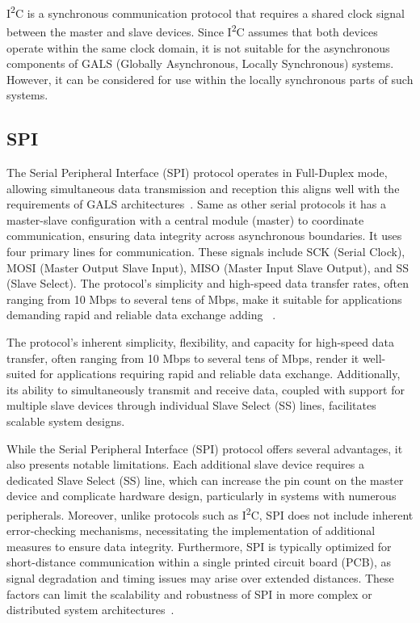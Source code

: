 I\textsuperscript{2}C is a synchronous communication protocol that requires a shared clock signal between the master and slave devices. Since I\textsuperscript{2}C assumes that both devices operate within the same clock domain, it is not suitable for the asynchronous components of GALS (Globally Asynchronous, Locally Synchronous) systems. However, it can be considered for use within the locally synchronous parts of such systems.

\subsection{SPI}
\label{subsub:spi}

The Serial Peripheral Interface (SPI) protocol operates in Full-Duplex mode, allowing simultaneous data transmission and reception this aligns well with the requirements of GALS architectures~\cite{spisite}. Same as other serial protocols it has a master-slave configuration with a central module (master) to coordinate communication, ensuring data integrity across asynchronous boundaries. It uses four primary lines for communication. These signals include SCK (Serial Clock), MOSI (Master Output Slave Input), MISO (Master Input Slave Output), and SS (Slave Select). The protocol's simplicity and high-speed data transfer rates, often ranging from 10 Mbps to several tens of Mbps, make it suitable for applications demanding rapid and reliable data exchange adding ~\cite{spisite}.

The protocol’s inherent simplicity, flexibility, and capacity for high-speed data transfer, often ranging from 10 Mbps to several tens of Mbps, render it well-suited for applications requiring rapid and reliable data exchange. Additionally, its ability to simultaneously transmit and receive data, coupled with support for multiple slave devices through individual Slave Select (SS) lines, facilitates scalable system designs.

While the Serial Peripheral Interface (SPI) protocol offers several advantages, it also presents notable limitations. Each additional slave device requires a dedicated Slave Select (SS) line, which can increase the pin count on the master device and complicate hardware design, particularly in systems with numerous peripherals. Moreover, unlike protocols such as  I\textsuperscript{2}C, SPI does not include inherent error-checking mechanisms, necessitating the implementation of additional measures to ensure data integrity. Furthermore, SPI is typically optimized for short-distance communication within a single printed circuit board (PCB), as signal degradation and timing issues may arise over extended distances. These factors can limit the scalability and robustness of SPI in more complex or distributed system architectures~\cite{spisite2}.


